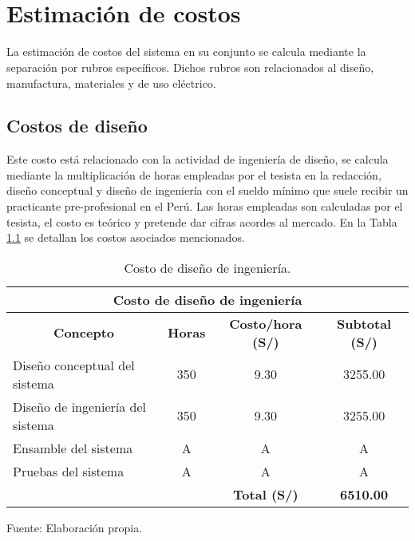 
\pagestyle{myportland}
\doublespacing
\chapter[\quad\quad\quad\quad ----- Estimación de costos]{\\ Estimación de costos}
\thispagestyle{myportland}

La estimación de costos del sistema en su conjunto se calcula mediante la separación por rubros específicos. Dichos rubros son relacionados al diseño, manufactura, materiales y de uso eléctrico.

\section{Costos de diseño}

Este costo está relacionado con la actividad de ingeniería de diseño, se calcula mediante la multiplicación de horas empleadas por el tesista en la redacción, diseño conceptual y diseño de ingeniería con el sueldo mínimo que suele recibir un practicante pre-profesional en el Perú. Las horas empleadas son calculadas por el tesista, el costo es teórico y pretende dar cifras acordes al mercado. En la Tabla \ref{tab:costo de diseno de ingenieria} se detallan los costos asociados mencionados.

\begin{table}[H]
	\footnotesize\centering
	\caption{Costo de diseño de ingeniería.}
	\label{tab:costo de diseno de ingenieria}
	\begin{tabular}{lc|c|c|}
		\hline
		\multicolumn{4}{|c|}{\textbf{Costo de diseño de ingeniería}}  \\ \hline
		\multicolumn{1}{|c|}{\textbf{Concepto}} & \multicolumn{1}{c|}{\textbf{Horas}} & \multicolumn{1}{c|}{\textbf{Costo/hora (S/)}} & \multicolumn{1}{c|}{\textbf{Subtotal (S/)}} \\ \hline
		\multicolumn{1}{|l|}{Diseño conceptual del sistema} & 350 & 9.30 & 3255.00 \\ \hline
		\multicolumn{1}{|l|}{Diseño de ingeniería del sistema} & 350 & 9.30 & 3255.00 \\ \hline
		\multicolumn{1}{|l|}{Ensamble del sistema} & A & A & A \\ \hline
		\multicolumn{1}{|l|}{Pruebas del sistema} & A & A & A \\ \hline
		& & \textbf{Total (S/)} & \textbf{6510.00}  \\ \cline{3-4} 
	\end{tabular}
	\begin{myflushcenteraftertable}	
		Fuente: Elaboración propia.
	\end{myflushcenteraftertable}
\end{table}

